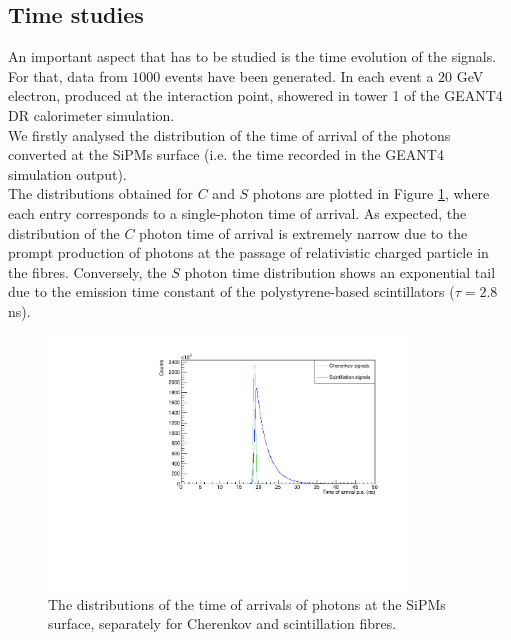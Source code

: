 \subsection{Time studies} \label{subsec:Time}
An important aspect that has to be studied is the time evolution of the signals.
For that, data from $1000$ events have been generated. In each event a $20$ GeV electron, produced at the interaction point, showered in tower 1 of the GEANT4 DR calorimeter simulation.\\
We firstly analysed the distribution of the time of arrival of the photons converted at the SiPMs surface (i.e. the time recorded in the GEANT4 simulation output).\\
The distributions obtained for $C$ and $S$ photons are plotted in Figure \ref{fig:true_toa_dist}, where each entry corresponds to a single-photon time of arrival.
As expected, the distribution of the $C$ photon time of arrival is extremely narrow due to the prompt production of photons at the passage of relativistic charged particle in the fibres. Conversely, the $S$ photon time distribution shows an exponential tail due to the emission time constant of the polystyrene-based scintillators ($\tau = 2.8$ ns).\\

\begin{figure}
	\centering
	\includegraphics[width=0.85\textwidth]{IMG/Cap5/TrueTimeDist20GeV}
	\caption{The distributions of the time of arrivals of photons at the SiPMs surface, separately for Cherenkov and scintillation fibres.}
	\label{fig:true_toa_dist}
\end{figure}

